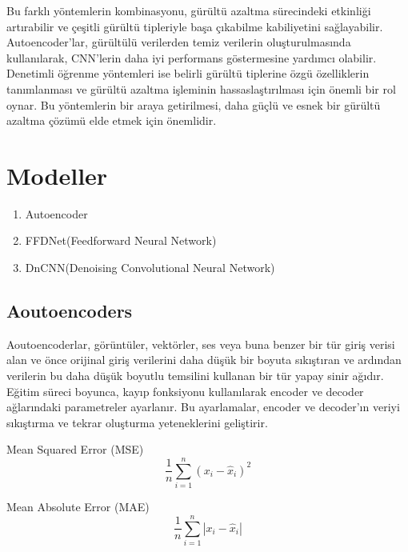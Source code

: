 \documentclass{article}
\begin{document}
 \noindent Bu farklı yöntemlerin kombinasyonu, gürültü azaltma sürecindeki etkinliği artırabilir ve çeşitli gürültü tipleriyle başa çıkabilme kabiliyetini sağlayabilir. Autoencoder'lar, gürültülü verilerden temiz verilerin oluşturulmasında kullanılarak, CNN'lerin daha iyi performans göstermesine yardımcı olabilir. Denetimli öğrenme yöntemleri ise belirli gürültü tiplerine özgü özelliklerin tanımlanması ve gürültü azaltma işleminin hassaslaştırılması için önemli bir rol oynar. Bu yöntemlerin bir araya getirilmesi, daha güçlü ve esnek bir gürültü azaltma çözümü elde etmek için önemlidir.\\[10pt]


\section{Modeller}
\begin{enumerate}
    \item Autoencoder
    \item FFDNet(Feedforward Neural Network)
    \item DnCNN(Denoising Convolutional Neural Network)
    
\end{enumerate}

\newpage
\subsection{Aoutoencoders}

\noindent Aoutoencoderlar, görüntüler, vektörler, ses veya buna benzer bir tür giriş verisi alan ve önce orijinal giriş verilerini daha düşük bir boyuta sıkıştıran ve ardından verilerin bu daha düşük boyutlu temsilini kullanan bir tür yapay sinir ağıdır.
Eğitim süreci boyunca, kayıp fonksiyonu kullanılarak encoder ve decoder ağlarındaki parametreler ayarlanır. Bu ayarlamalar, encoder ve decoder'ın veriyi sıkıştırma ve tekrar oluşturma yeteneklerini geliştirir.\vspace{1 cm}

Mean Squared Error (MSE) 
\begin{equation}
    \frac{1}{n} \sum_{i=1}^{n} (x_{i} - \hat{x}_{i})^2
\end{equation}

Mean Absolute Error (MAE)
\begin{equation}
    \frac{1}{n} \sum_{i=1}^{n} |x_{i} - \hat{x}_{i}|
\end{equation}

\renewcommand{\figurename}{Şekil}
\end{document}
